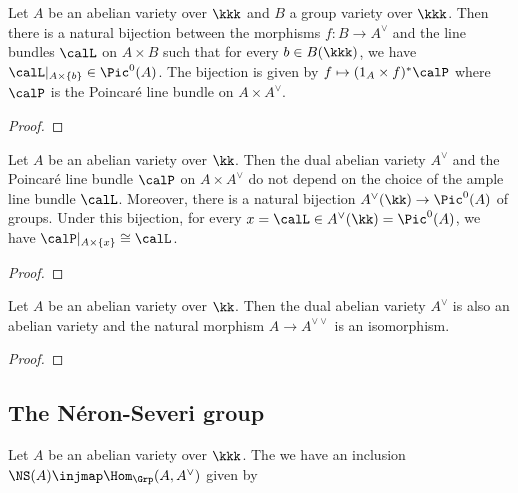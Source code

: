     \begin{lemma}\label{prop:universal_property_of_dual_abelian_variety}
        Let \(A\) be an abelian variety over \(\kkk\) and \(B\) a group variety over \(\kkk\).
        Then there is a natural bijection between the morphisms \(f: B \to A^\vee\) and the line bundles \(\calL\) on \(A \times B\) such that for every \(b \in B(\kkk)\), we have \(\calL|_{A \times \{b\}} \in \Pic^0(A)\).
        The bijection is given by \(f \mapsto (1_A \times f)^*\calP\) where \(\calP\) is the Poincar\'e line bundle on \(A \times A^\vee\).
    \end{lemma}
    \begin{proof}
    \end{proof}

    \begin{theorem}\label{thm:dual_abelian_variety_as_Pic0}
        Let $A$ be an abelian variety over $\kk$. 
        Then the dual abelian variety \(A^\vee\) and the Poincar\'e line bundle \(\calP\) on \(A \times A^\vee\) do not depend on the choice of the ample line bundle \(\calL\).
        Moreover, there is a natural bijection \(A^\vee(\kk) \to \Pic^0(A)\) of groups.
        Under this bijection, for every \(x = \calL \in A^\vee(\kk) = \Pic^0(A)\), we have \(\calP|_{A \times \{x\}} \cong \calL\).
    \end{theorem}
    \begin{proof}
    \end{proof}

    \begin{proposition}\label{prop:dual_of_dual_is_A}
        Let \(A\) be an abelian variety over \(\kk\).
        Then the dual abelian variety \(A^\vee\) is also an abelian variety and the natural morphism \(A \to A^{\vee\vee}\) is an isomorphism.
    \end{proposition}
    \begin{proof}
    \end{proof}


\subsection{The N\'eron-Severi group}


    \begin{theorem}\label{thm:NS_A_as_homomorphisms_from_A_to_A_dual}
        Let \(A\) be an abelian variety over \(\kkk\).
        The we have an inclusion \(\NS(A) \injmap \Hom_{\Grp}(A, A^\vee)\) given by 
    \end{theorem}